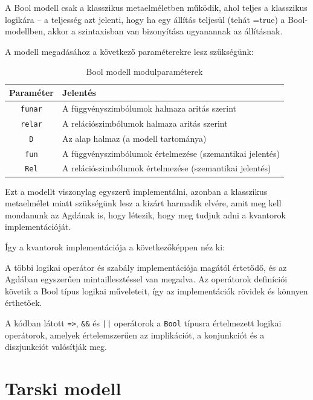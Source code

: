 A Bool modell csak a klasszikus metaelméletben működik, ahol teljes a
klasszikus logikára -- a teljesség azt jelenti, hogy ha egy
állítás teljesül (tehát =true) a Bool-modellben, akkor a szintaxisban
van bizonyítása ugyanannak az állításnak.

A modell megadásához a következő paraméterekre lesz szükségünk:
\bmModuleParams

\begin{table}[H]
\centering
\begin{tabular}{|c|l|}
\hline
\textbf{Paraméter} & \textbf{Jelentés} \\
\hline
\texttt{funar} & A függvényszimbólumok halmaza aritás szerint \\
\hline
\texttt{relar} & A relációszimbólumok halmaza aritás szerint \\
\hline
\texttt{D} & Az alap halmaz (a modell tartománya) \\
\hline
\texttt{fun} & A függvényszimbólumok értelmezése (szemantikai jelentés) \\ \hline
\texttt{Rel} & A relációszimbólumok értelmezése (szemantikai jelentés) \\
\hline
\end{tabular}
\caption{Bool modell modulparaméterek}
\label{tab:boolmodel_module_params}
\end{table}


Ezt a modellt viszonylag egyszerű implementálni, azonban a klasszikus metaelmélet miatt szükségünk lesz a kizárt harmadik elvére, amit meg kell mondanunk az Agdának is, hogy létezik, hogy meg tudjuk adni a kvantorok implementációját.

\bmLem

Így a kvantorok implementációja a következőképpen néz ki:
\bmForall
\bmExists

A többi logikai operátor és szabály implementációja magától értetődő, és az Agdában egyszerűen mintaillesztéssel van megadva. Az operátorok definíciói követik a Bool típus logikai műveleteit, így az implementációk rövidek és könnyen érthetőek.

\bmBoolModel

A kódban látott \texttt{=>}, \texttt{\&\&} és \texttt{||} operátorok a \texttt{Bool} típusra értelmezett logikai operátorok, amelyek értelemszerűen az implikációt, a konjunkciót és a diszjunkciót valósítják meg.

\section{Tarski modell}

